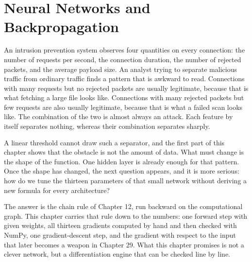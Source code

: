 \chapter{Neural Networks and Backpropagation}

An intrusion prevention system observes four quantities on every connection: the number of
requests per second, the connection duration, the number of rejected packets, and the average
payload size. An analyst trying to separate malicious traffic from ordinary traffic finds a
pattern that is awkward to read. Connections with many requests but no rejected packets are
usually legitimate, because that is what fetching a large file looks like. Connections with many
rejected packets but few requests are also usually legitimate, because that is what a failed scan
looks like. The combination of the two is almost always an attack. Each feature by itself
separates nothing, whereas their combination separates sharply.

A linear threshold cannot draw such a separator, and the first part of this chapter shows that
the obstacle is not the amount of data. What must change is the shape of the function. One hidden
layer is already enough for that pattern. Once the shape has changed, the next question appears,
and it is more serious: how do we tune the thirteen parameters of that small network without
deriving a new formula for every architecture?

The answer is the chain rule of Chapter 12, run backward on the computational graph. This chapter
carries that rule down to the numbers: one forward step with given weights, all thirteen
gradients computed by hand and then checked with NumPy, one gradient-descent step, and the
gradient with respect to the input that later becomes a weapon in Chapter 29. What this chapter
promises is not a clever network, but a differentiation engine that can be checked line by line.

